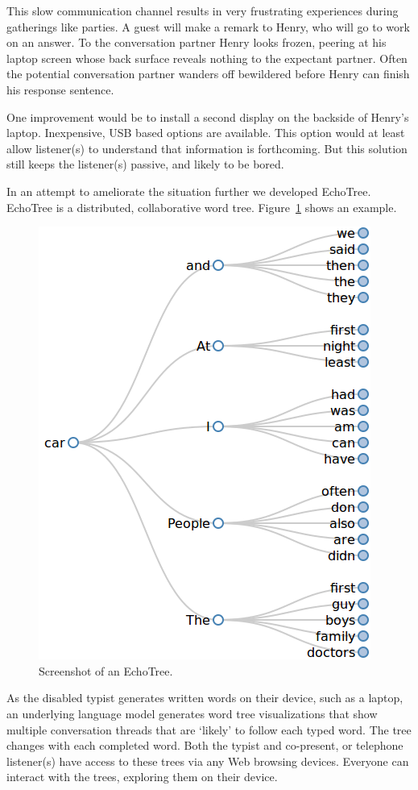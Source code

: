 \documentclass{sigchi}
\begin{document}
This slow communication channel results in very frustrating
experiences during gatherings like parties. A guest will make a remark
to Henry, who will go to work on an answer. To the conversation
partner Henry looks frozen, peering at his laptop screen whose back
surface reveals nothing to the expectant partner. Often the potential
conversation partner wanders off bewildered before Henry can finish
his response sentence.

One improvement would be to install a second display on the backside
of Henry's laptop. Inexpensive, USB based options are available. This
option would at least allow listener(s) to understand that information
is forthcoming. But this solution still keeps the listener(s) passive,
and likely to be bored.

In an attempt to ameliorate the situation further we developed
EchoTree. EchoTree is a distributed, collaborative word
tree. Figure~\ref{fig:echoTree} shows an example.
\begin{figure}
   \centering
   \includegraphics[width=0.6\columnwidth]{Figs/henryBigramsCarTree.png}
   \caption{Screenshot of an EchoTree.}
   \label{fig:echoTree}
\end{figure}
As the disabled typist generates written words on their device, such
as a laptop, an underlying language model generates word tree
visualizations that show multiple conversation threads that are
`likely' to follow each typed word. The tree changes with each
completed word. Both the typist and co-present, or telephone
listener(s) have access to these trees via any Web browsing
devices. Everyone can interact with the trees, exploring them on their
device.
\end{document}
